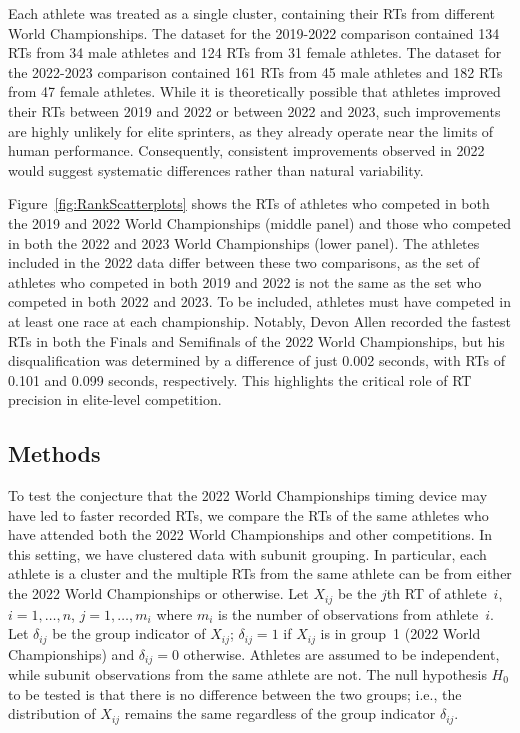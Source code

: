 \documentclass[12pt, letterpaper]{article}
\begin{document}
Each athlete was treated as a single cluster, containing their RTs
from different World Championships. The dataset for the 2019-2022
comparison contained 134 RTs from 34 male athletes and 124
RTs from 31 female athletes. The dataset for the 2022-2023
comparison contained 161 RTs from 45 male athletes and 182
RTs from 47 female athletes. While it is theoretically
possible that athletes improved their RTs between 2019 and
2022 or between 2022 and 2023, such improvements are highly unlikely for
elite sprinters, as they already operate near the limits of human
performance. Consequently, consistent improvements observed in 2022
would suggest systematic differences rather than natural variability.


Figure~\ref{fig:RankScatterplots} shows the RTs of athletes
who competed in both the 2019 and 2022 World Championships (middle
panel) and those who competed in both the 2022 and 2023 World
Championships (lower panel). The athletes included in the 2022 data
differ between these two comparisons, as the set of athletes who
competed in both 2019 and 2022 is not the same as the set who competed
in both 2022 and 2023. To be included, athletes must have competed in
at least one race at each championship. Notably, Devon Allen recorded
the fastest RTs in both the Finals and Semifinals of the
2022 World Championships, but his disqualification was determined by a
difference of just 0.002 seconds, with RTs of 0.101 and
0.099 seconds, respectively. This highlights the critical role of
RT precision in elite-level competition.

\subsection{Methods}
\label{sec:methods_2022}


To test the conjecture that the 2022 World Championships timing device may have
led to faster recorded RTs, we compare the RTs of the same
athletes who have attended both the 2022 World Championships and other
competitions.
In this setting, we have clustered data with subunit grouping. In particular,
each athlete is a cluster and the multiple RTs from the same athlete
can be from either the 2022 World Championships or otherwise.
Let $X_{ij}$ be the $j$th RT of athlete~$i$, $i = 1, \ldots, n$,
$j = 1, \ldots, m_i$ where $m_i$ is the number of observations from
athlete~$i$. Let $\delta_{ij}$ be the group indicator of $X_{ij}$; $\delta_{ij}
= 1$ if $X_{ij}$ is in group~1 (2022 World Championships) and $\delta_{ij} = 0$
otherwise. Athletes are
assumed to be independent, while subunit observations from the same athlete are
not. The null hypothesis $H_0$ to be tested is that there is no difference
between the two groups; i.e., the distribution of $X_{ij}$ remains the same
regardless of the group indicator $\delta_{ij}$.
\end{document}
